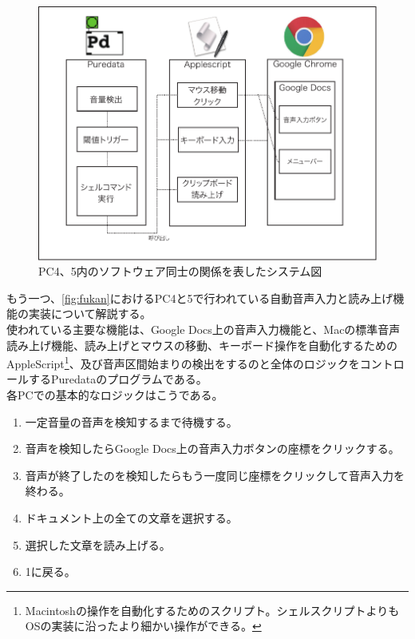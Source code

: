 \documentclass[a4paper,report]{jsbook}
\begin{document}
\begin{figure}[htbp]
\centering
\includegraphics[width=1.00000\textwidth]{./img/yomiage_diagram.pdf}
\caption{PC4、5内のソフトウェア同士の関係を表したシステム図\label{fig:yomiage}}
\end{figure}

もう一つ、\cref{fig:fukan}におけるPC4と5で行われている自動音声入力と読み上げ機能の実装について解説する。\\
使われている主要な機能は、Google
Docs上の音声入力機能と、Macの標準音声読み上げ機能、読み上げとマウスの移動、キーボード操作を自動化するためのAppleScript\footnote{Macintoshの操作を自動化するためのスクリプト。シェルスクリプトよりもOSの実装に沿ったより細かい操作ができる。}、及び音声区間始まりの検出をするのと全体のロジックをコントロールするPuredataのプログラムである。\\
各PCでの基本的なロジックはこうである。

\begin{enumerate}
\def\labelenumi{\arabic{enumi}.}
\tightlist
\item
  一定音量の音声を検知するまで待機する。
\item
  音声を検知したらGoogle Docs上の音声入力ボタンの座標をクリックする。
\item
  音声が終了したのを検知したらもう一度同じ座標をクリックして音声入力を終わる。
\item
  ドキュメント上の全ての文章を選択する。
\item
  選択した文章を読み上げる。
\item
  1に戻る。
\end{enumerate}
\end{document}
